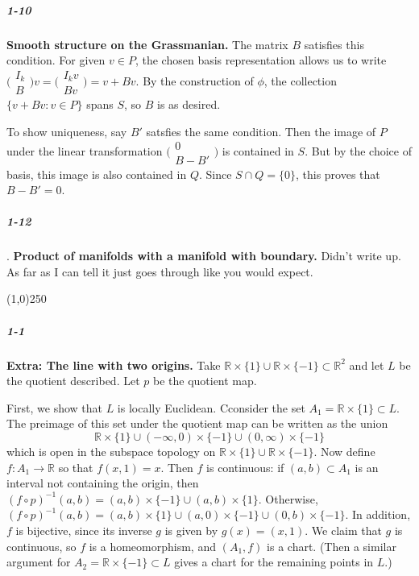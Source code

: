 \documentclass[10pt,letter]{article}
\begin{document}
\subparagraph{1-10} \textbf{Smooth structure on the Grassmanian.} The matrix $B$ satisfies this condition. For given $v \in P$, the chosen basis representation allows us to write $\bigg( \begin{array}{c} I_k \\ B \end{array} \bigg)v = \bigg( \begin{array}{c} I_kv \\ Bv \end{array} \bigg) = v + Bv$. By the construction of $\phi$, the collection $\lbrace v + Bv: v \in P \rbrace$ spans $S$, so $B$ is as desired.

To show uniqueness, say $B'$ satsfies the same condition. Then the image of $P$ under the linear transformation $\bigg( \begin{array}{c} 0 \\ B-B' \end{array} \bigg)$ is contained in $S$. But by the choice of basis, this image is also contained in $Q$. Since $S \cap Q = \lbrace 0 \rbrace$, this proves that $B-B' = 0$. 

\subparagraph{1-12}. \textbf{Product of manifolds with a manifold with boundary.} Didn't write up. As far as I can tell it just goes through like you would expect. 
\begin{center}
\line(1,0){250}
\end{center}



\subparagraph{1-1} \textbf{Extra: The line with two origins.} Take $\mathbb{R} \times \lbrace 1 \rbrace \cup \mathbb{R} \times \lbrace -1 \rbrace \subset \mathbb{R}^2$ and let $L$ be the quotient described. Let $p$ be the quotient map.  

First, we show that $L$ is locally Euclidean. Cconsider the set $A_1 = \mathbb{R} \times \lbrace 1 \rbrace \subset L$. The preimage of this set under the quotient map can be written as the union
\begin{equation*}
\mathbb{R} \times \lbrace 1 \rbrace  \cup (-\infty,0) \times \lbrace -1 \rbrace \cup (0,\infty) \times \lbrace -1 \rbrace
\end{equation*}
which is open in the subspace topology on $\mathbb{R} \times \lbrace 1 \rbrace \cup \mathbb{R} \times \lbrace -1 \rbrace$. Now define $f: A_1 \rightarrow \mathbb{R}$ so that $f(x,1) = x$. Then $f$ is continuous: if $(a,b) \subset A_1$ is an interval not containing the origin, then $(f \circ p)^{-1}(a,b) = (a,b) \times \lbrace -1 \rbrace \cup (a,b) \times \lbrace 1 \rbrace$. Otherwise, $(f \circ p)^{-1}(a,b) = (a,b) \times \lbrace 1 \rbrace \cup (a,0) \times \lbrace -1 \rbrace \cup (0,b) \times \lbrace -1 \rbrace$. In addition, $f$ is bijective, since its inverse $g$ is given by $g(x) = (x,1)$. We claim that $g$ is continuous, so $f$ is a homeomorphism, and $(A_1,f)$ is a chart. (Then a similar argument for $A_2 = \mathbb{R} \times \lbrace -1 \rbrace \subset L$ gives a chart for the remaining points in $L$.)
\end{document}
